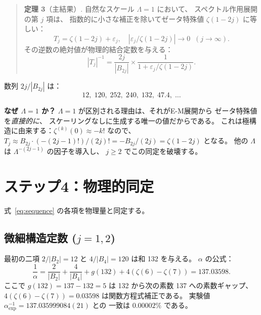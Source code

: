 \documentclass[11pt,a4paper]{article}
\begin{document}
\begin{quote}
\textbf{定理 3}（主結果）.
自然なスケール $\Lambda=1$ において、
スペクトル作用展開の第 $j$ 項は、
指数的に小さな補正を除いてゼータ特殊値 $\zeta(1{-}2j)$ に等しい：
\begin{equation}
  T_j = \zeta(1{-}2j) + \varepsilon_j,
  \quad |\varepsilon_j/\zeta(1{-}2j)|\to 0 \;\;(j\to\infty).
\end{equation}
その逆数の絶対値が物理的結合定数を与える：
\begin{equation}\label{eq:coupling}
  |T_j|^{-1} = \frac{2j}{|B_{2j}|}\times\frac{1}{1+\varepsilon_j/\zeta(1{-}2j)}.
\end{equation}
\end{quote}

数列 $2j/|B_{2j}|$ は：
\begin{equation}\label{eq:sequence}
  12,\;120,\;252,\;240,\;132,\;47.4,\;\ldots
\end{equation}

\medskip

\textbf{なぜ $\Lambda=1$ か？}\quad
$\Lambda=1$ が区別される理由は、それがE-M展開から
ゼータ特殊値を\textit{直接的に}、
スケーリングなしに生成する唯一の値だからである。
これは極構造に由来する：$\zeta^{(k)}(0)\approx -k!$ なので、
$T_j\approx B_{2j}\cdot(-(2j{-}1)!)/(2j)!=-B_{2j}/(2j)=\zeta(1{-}2j)$
となる。
他の $\Lambda$ は $\Lambda^{-(2j-1)}$ の因子を導入し、
$j\geq 2$ でこの同定を破壊する。

\section{ステップ4：物理的同定}

式~\eqref{eq:sequence} の各項を物理量と同定する。

\subsection{微細構造定数 ($j=1,2$)}

最初の二項 $2/|B_2|=12$ と $4/|B_4|=120$ は和 132 を与える。
$\alpha$ の公式：
\begin{equation}\label{eq:alpha}
  \frac{1}{\alpha}=\frac{2}{|B_2|}+\frac{4}{|B_4|}+g(132)+4(\zeta(6)-\zeta(7))
  =137.03598.
\end{equation}
ここで $g(132)=137-132=5$ は 132 から次の素数 137 への素数ギャップ、
$4(\zeta(6)-\zeta(7))=0.03598$ は関数方程式補正である。
実験値 $\alpha^{-1}_{\mathrm{exp}}=137.035999084(21)$ との
一致は $0.00002\%$ である。
\end{document}
